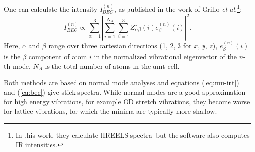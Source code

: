\documentclass[11pt,DIV=13,BCOR=5mm,a4paper,headinclude]{scrbook}
\begin{document}
\begin{itemize}
One can calculate the intensity $I^{(n)}_{BEC}$\cite{Bruesch1986,Baroni2001}, as published in the work of Grillo \textit{et al.}\cite{BEC}\footnote{In this work, they calculate HREELS spectra, but the software also computes IR intensities.}:
\begin{equation}\label{eq:bec}
  I_{BEC}^{(n)} \propto \sum_{\alpha=1}^3|\sum_{i=1}^{N_A}\sum_{\beta=1}^3 Z_{\alpha\beta}^\star(i)e^{(n)}_\beta(i)|^2.
\end{equation}
Here, $\alpha$ and $\beta$ range over three cartesian directions (1, 2, 3 for $x$, $y$, $z$), $e^{(n)}_\beta(i)$ is the $\beta$ component of atom $i$ in the normalized vibrational eigenvector of the $n$-th mode, $N_A$ is the total number of atoms in the unit cell.


\end{itemize}
Both methods are based on normal mode analyses and equations (\ref{eq:mu-int}) and (\ref{eq:bec}) give stick spectra.
While normal modes are a good approximation for high energy vibrations, for example OD stretch vibrations, they become worse for lattice vibrations, for which the minima are typically more shallow.
\end{document}
